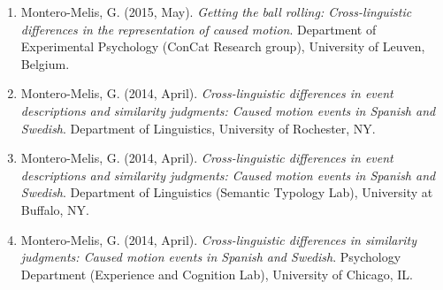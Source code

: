 \documentclass[margin, 11pt]{res} %
\begin{document}
\begin{resume}
\begin{enumerate}
\item Montero-Melis, G. (2015, May). \textit{Getting the ball rolling: Cross-linguistic differences in the representation of caused motion}. Department of Experimental Psychology (ConCat Research group), University of Leuven, Belgium.

\item Montero-Melis, G. (2014, April). \textit{Cross-linguistic differences in event descriptions and similarity judgments: Caused motion events in Spanish and Swedish}. Department of Linguistics, University of Rochester, NY.

\item Montero-Melis, G. (2014, April). \textit{Cross-linguistic differences in event descriptions and similarity judgments: Caused motion events in Spanish and Swedish}. Department of Linguistics (Semantic Typology Lab), University at Buffalo, NY.

\item Montero-Melis, G. (2014, April). \textit{Cross-linguistic differences in similarity judgments: Caused motion events in Spanish and Swedish}. Psychology Department (Experience and Cognition Lab), University of Chicago, IL.

\end{enumerate}



%
%
%
%
%
%
%



\end{resume}
\end{document}
